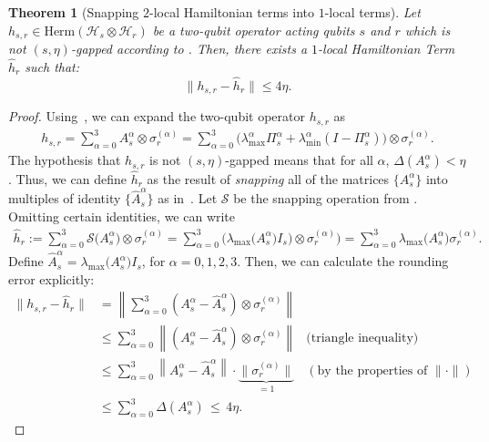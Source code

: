 \documentclass[11pt]{article}
\theoremstyle{plain}
\newtheorem{theorem}{Theorem}[section]
\begin{document}
\begin{theorem}[Snapping $2$-local Hamiltonian terms into $1$-local terms]
\label{thm:snapping-2-local-hamiltonian-term}
   Let $h_{s,r} \in \mathrm{Herm}(\mathcal{H}_s \otimes \mathcal{H}_r)$ be a two-qubit operator acting qubits $s$ and $r$ which is not $(s,\eta)$-gapped according to . Then, there exists a $1$-local Hamiltonian Term $\hat{h}_{r}$ such that:
    \begin{equation}
    \label{eqn:snapped-distance-between-hamiltonian-terms}
        \|h_{s,r} - \hat{h}_{r}\| \leq 4 \eta.
    \end{equation}
\end{theorem}
\begin{proof}
Using~, we can expand the two-qubit operator $h_{s,r}$ as
    \begin{align*}
        h_{s,r} = \sum\limits_{\alpha = 0}^{3} A_{s}^{\alpha} \otimes \sigma_{r}^{(\alpha)}
        = \sum\limits_{\alpha = 0}^{3} \Big(\lambda_{\max}^{\alpha} \Pi_{s}^{\alpha} + \lambda_{\min}^{\alpha} \left(I - \Pi_{s}^{\alpha}\right)\Big) \otimes \sigma_{r}^{(\alpha)}.
    \end{align*}
The hypothesis that $h_{s,r}$ is not $(s,\eta)$-gapped  means that for all $\alpha$, $\Delta(A_{s}^{\alpha}) < \eta$. Thus, we can define $\hat{h}_r$ as the result of \emph{snapping} all of the matrices $\{A_s^{\alpha}\}$ into multiples of identity $\{\hat{A}_s^{\alpha}\}$ as in~. Let $\mathcal{S}$ be the snapping operation from . Omitting certain identities, we can write
\begin{align}
    \hat{h}_r := \sum\limits_{\alpha = 0}^{3} \mathcal{S}\big(A_{s}^{\alpha}\big) \otimes \sigma_{r}^{(\alpha)}
    = \sum\limits_{\alpha = 0}^{3}  \big(\lambda_{\max}\big(A_{s}^{\alpha}\big)I_s\big) \otimes \sigma_{r}^{(\alpha)}\big) =\sum\limits_{\alpha = 0}^{3} \lambda_{\max}\big(A_{s}^{\alpha}\big)  \sigma_{r}^{(\alpha)}.
\end{align}
Define $\hat{A}_s^{\alpha} =\lambda_{\max}\big(A_{s}^{\alpha}\big) I_s$, for $\alpha=0,1,2,3$. Then, we can calculate the rounding error explicitly:
\begin{align*}
    \|h_{s,r} - \hat{h}_{r}\| &= \left\|\sum\limits_{\alpha = 0}^{3} \left( A_s^{\alpha} - \hat{A}_s^{\alpha} \right)\otimes \sigma_{r}^{(\alpha)}\right\|\\
    &\leq \sum\limits_{\alpha = 0}^{3} \left\|\left( A_s^{\alpha} - \hat{A}_s^{\alpha} \right)\otimes \sigma_{r}^{(\alpha)} \right\| & \text{(triangle inequality)}\\
    &\leq \sum\limits_{\alpha = 0}^{3} \left\| A_s^{\alpha} - \hat{A}_s^{\alpha}  \right\| \cdot \underbrace{\| \sigma_r^{(\alpha)} \|}_{=1} & (\text{by the properties of } \|\cdot\|)\\
    &\leq \sum\limits_{\alpha = 0}^{3} \Delta(A_{s}^{\alpha}) \,\leq\, 4 \eta.
\end{align*}
\end{proof}
 
\end{document}
